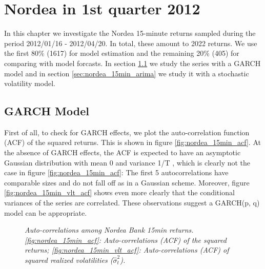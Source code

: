 \chapter{Nordea in 1st quarter 2012}
\label{chp:nordea_15min}
In this chapter we investigate the Nordea 15-minute returns sampled
during the period 2012/01/16 - 2012/04/20. In total, these amount to
2022 returns. We use the first 80\% (1617) for model estimation and  the
remaining 20\% (405) for comparing with model forcasts. In section
\ref{sec:nordea_15min_garch} we study the series with a GARCH model 
and in section \ref{sec:nordea_15min_arima} we study it with a
stochastic volatility model.

\section{GARCH Model}\label{sec:nordea_15min_garch}
First of all, to check for GARCH effects, we plot the auto-correlation
function (ACF) of the squared returns. This is shown in figure
\ref{fig:nordea_15min_acf}. At the absence of GARCH effects, the ACF
is expected to have an asymptotic Gaussian distribution with mean 0
and variance 1/T \cite{Bollerslev86, Bollerslev87}, which is clearly
not the case in figure \ref{fig:nordea_15min_acf}: The first 5
autocorrelations have comparable sizes and do not fall off as in a
Gaussian scheme. Moreover, figure \ref{fig:nordea_15min_vlt_acf} shows
even more clearly that the conditional variances of the series are
correlated. These observations suggest a GARCH(p, q) model can be
appropriate.
\begin{figure}[htb!]
  \centering
  \caption{\small \it Auto-correlations among Nordea Bank 15min
    returns. \ref{fig:nordea_15min_acf}: Auto-correlations (ACF) of the
    squared returns; \ref{fig:nordea_15min_vlt_acf}: Auto-correlations
    (ACF) of squared realized volatilities ($\hat{\sigma}^2_t$).}
\end{figure}

